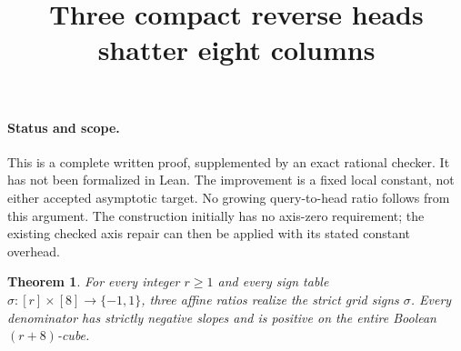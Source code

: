 \documentclass[11pt]{article}
\title{Three compact reverse heads shatter eight columns}
\author{}
\date{}
\newtheorem{theorem}{Theorem}
\begin{document}
\maketitle

\paragraph{Status and scope.}
This is a complete written proof, supplemented by an exact rational
checker. It has not been formalized in Lean. The improvement is a fixed
local constant, not either accepted asymptotic target. No growing
query-to-head ratio follows from this argument. The construction initially
has no axis-zero requirement; the existing checked axis repair can then
be applied with its stated constant overhead.

\begin{theorem}
For every integer $r\geq1$ and every sign table
$\sigma:[r]\times[8]\to\{-1,1\}$, three affine ratios realize the
strict grid signs $\sigma$. Every denominator has strictly negative
slopes and is positive on the entire Boolean $(r+8)$-cube.
\end{theorem}
\end{document}

